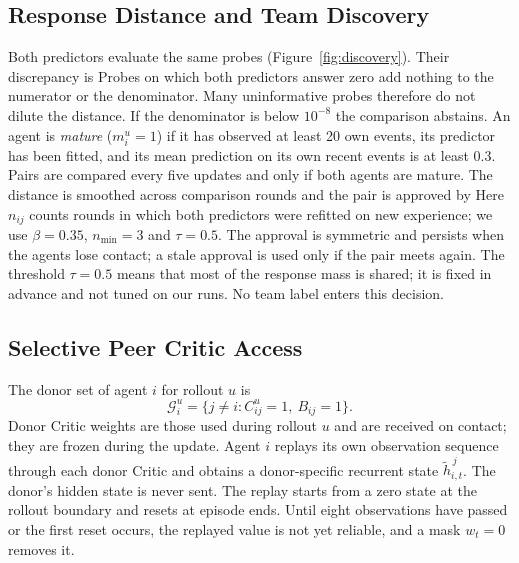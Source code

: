 \documentclass{article}
\begin{document}
\subsection{Response Distance and Team Discovery}
Both predictors evaluate the same probes (Figure~\ref{fig:discovery}). Their discrepancy is
\DistanceEquation
Probes on which both predictors answer zero add nothing to the numerator or the denominator. Many uninformative probes therefore do not dilute the distance. If the denominator is below $10^{-8}$ the comparison abstains. An agent is \emph{mature} ($m_i^u=1$) if it has observed at least 20 own events, its predictor has been fitted, and its mean prediction on its own recent events is at least 0.3. Pairs are compared every five updates and only if both agents are mature. The distance is smoothed across comparison rounds and the pair is approved by
\ApprovalEquation
Here $n_{ij}$ counts rounds in which both predictors were refitted on new experience; we use $\beta=0.35$, $n_{\min}=3$ and $\tau=0.5$. The approval is symmetric and persists when the agents lose contact; a stale approval is used only if the pair meets again. The threshold $\tau=0.5$ means that most of the response mass is shared; it is fixed in advance and not tuned on our runs. No team label enters this decision.

\subsection{Selective Peer Critic Access}
The donor set of agent $i$ for rollout $u$ is
\begin{equation}\label{eq:donorset}
\mathcal G_i^u=\{j\ne i: C_{ij}^u=1,\ B_{ij}=1\}.
\end{equation}
Donor Critic weights are those used during rollout $u$ and are received on contact; they are frozen during the update. Agent $i$ replays its own observation sequence through each donor Critic and obtains a donor-specific recurrent state $\tilde h^{\,j}_{i,t}$. The donor's hidden state is never sent. The replay starts from a zero state at the rollout boundary and resets at episode ends. Until eight observations have passed or the first reset occurs, the replayed value is not yet reliable, and a mask $w_t=0$ removes it.
\end{document}
